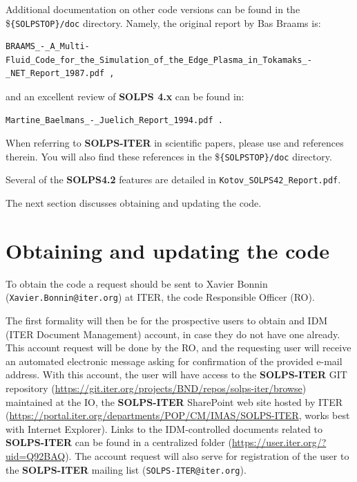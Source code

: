 \documentclass[a4paper,10pt]{report}
\newcommand\SOLPSfour{{\bf SOLPS 4.x} }
\newcommand\SOLPSITER{{\bf SOLPS-ITER} }
\begin{document}
Additional documentation on other code versions can be found in the \${\tt \{SOLPSTOP\}/doc} directory.
Namely, the original report by Bas Braams is:
\begin{Verbatim}[fontsize=\footnotesize]
BRAAMS_-_A_Multi-Fluid_Code_for_the_Simulation_of_the_Edge_Plasma_in_Tokamaks_-_NET_Report_1987.pdf ,
\end{Verbatim}
and an excellent review of \SOLPSfour can be found in:
\begin{verbatim}
Martine_Baelmans_-_Juelich_Report_1994.pdf .
\end{verbatim}

When referring to \SOLPSITER in scientific papers, please use \cite{WiesenPSI2014,BONNINPET15} and references therein. You will also find these references in the \${\tt \{SOLPSTOP\}/doc} directory.

Several of the {\bf SOLPS4.2} features are detailed in {\tt Kotov\_SOLPS42\_Report.pdf}.

The next section discusses obtaining and updating the code.

\section{Obtaining and updating the code}
\label{solpsdistribution}

To obtain the code a request should be sent to Xavier Bonnin
({\tt Xavier.Bonnin@iter.org}) at ITER, the code Responsible Officer (RO).

The first formality will then be for the prospective users to obtain and IDM (ITER Document Management) account, in case they do not have one already. This account request will be done by the RO, and the requesting user will receive an automated electronic message asking for confirmation of the provided e-mail address. With this account, the user will have access to the \SOLPSITER GIT repository (\href{https://git.iter.org/projects/BND/repos/solps-iter/browse}{https://git.iter.org/projects/BND/repos/solps-iter/browse}) maintained at the IO, the \SOLPSITER SharePoint web site hosted by ITER (\href{https://portal.iter.org/departments/POP/CM/IMAS/SOLPS-ITER}{https://portal.iter.org/departments/POP/CM/IMAS/SOLPS-ITER}, works best with Internet Explorer). Links to the IDM-controlled documents related to \SOLPSITER can be found in a centralized folder (\href{https://user.iter.org/?uid=Q92BAQ}{https://user.iter.org/?uid=Q92BAQ}). The account request will also serve for registration of the user to the \SOLPSITER mailing list ({\tt SOLPS-ITER@iter.org}).
\end{document}
